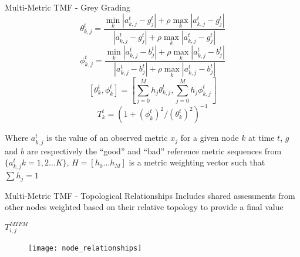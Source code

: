 \documentclass[aspectratio=169]{beamer}
\begin{document}
\begin{frame}{Multi-Metric TMF - Grey Grading} 
  \begin{equation}
    \label{eq:grcg}
    \theta_{k,j}^t = \frac{\min_k|a_{k,j}^t - g_j^t| + \rho \max_k|a_{k,j}^t-g_j^t|}{|a_{k,j}^t-g_j^t| + \rho \max_k|a_{k,j}^t-g_j^t|} 
  \end{equation}
  \begin{equation}
    \label{eq:grcb}
    \phi_{k,j}^t = \frac{\min_k|a_{k,j}^t - b_j^t| + \rho \max_k|a_{k,j}^t-b_j^t|}{|a_{k,j}^t-b_j^t| + \rho \max_k|a_{k,j}^t-b_j^t|} 
  \end{equation}
  \begin{equation}
    \label{eq:grc}
    [\theta_k^t, \phi_k^t] = \left[\sum_{j=0}^M h_j \theta_{k,j}^t,\sum_{j=0}^M h_j \phi_{k,j}^t \right]
  \end{equation}
  \begin{equation}
    \label{eq:grcT}
    T_k^t = ({1+{(\phi_k^t)^2}/{(\theta_k^t)^2}})^{-1}
  \end{equation}

  Where  $a_{k,j}^t$ is the value of an observed metric $x_j$ for a given node $k$ at time $t$,  $g$ and $b$ are respectively the ``good'' and ``bad'' reference metric sequences from $\{a_{k,j}^t k=1,2\dots K\}$, $H=[h_0\dots h_M]$ is a metric weighting vector such that $\sum h_j = 1$

\end{frame}
\begin{frame}{Multi-Metric TMF - Topological Relationships} 
  \centering
  Includes shared assessments from other nodes weighted based on their relative topology to provide a final value\footnotemark  

  \vspace{9pt}

  $T_{i,j}^{MTFM}$
  \begin{figure}[h]
    \centering
    \texttt{[image: node\_relationships]}
    \label{fig:node_relationships}
  \end{figure}

\end{frame}
\end{document}
